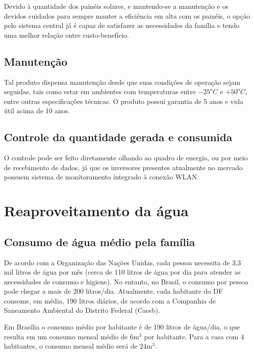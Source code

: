 	Devido à quantidade dos painéis solares, e mantendo-se a manutenção e os devidos cuidados para sempre manter a eficiência em alta com os painéis, o opção pelo sistema central já é capaz de satisfazer as necessidades da família e tendo uma melhor relação entre custo-benefício.

\subsection{Manutenção}

	Tal produto dispensa manutenção desde que suas condições de operação sejam seguidas, tais como estar em ambientes com temperaturas entre $-25^oC$ e $+50^oC$, entre outras especificações técnicas. O produto possui garantia de 5 anos e vida útil acima de 10 anos.


\subsection{Controle da quantidade gerada e consumida}

	O controle pode ser feito diretamente olhando ao quadro de energia, ou por meio de recebimento de dados, já que os inversores presentes atualmente no mercado possuem sistema de monitoramento integrado à conexão WLAN.


\section{Reaproveitamento da água}

\subsection{Consumo de água médio pela família}

	De acordo com a Organização das Nações Unidas, cada pessoa necessita de 3,3 mil litros de água por mês (cerca de 110 litros de água por dia para atender as necessidades de consumo e higiene). No entanto, no Brasil, o consumo por pessoa pode chegar a mais de 200 litros/dia. Atualmente, cada habitante do DF consome, em média, 190 litros diários, de acordo com a Companhia de Saneamento Ambiental do Distrito Federal (Caesb).

	Em Brasília o consumo médio por habitante é de 190 litros de água/dia, o que resulta em um consumo mensal médio de $6\si{\meter}^3$ por habitante. Para a casa com 4 habitantes, o consumo mensal médio será de $24\si{\meter}^3$.

